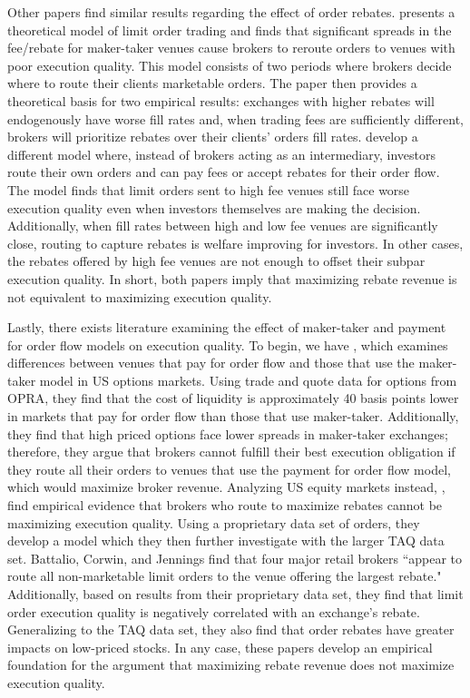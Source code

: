 \documentclass[12pt,a4paper]{extarticle}
\begin{document}
Other papers find similar results regarding the effect of order rebates. \citet{Cimon} presents a theoretical model of limit order trading and finds that significant spreads in the fee/rebate for maker-taker venues cause brokers to reroute orders to venues with poor execution quality. This model consists of two periods where brokers decide where to route their clients marketable orders. The paper then provides a theoretical basis for two empirical results: exchanges with higher rebates will endogenously have worse fill rates and, when trading fees are sufficiently different, brokers will prioritize rebates over their clients' orders fill rates. \citet{Maglaras} develop a different model where, instead of brokers acting as an intermediary, investors route their own orders and can pay fees or accept rebates for their order flow. The model finds that limit orders sent to high fee venues still face worse execution quality even when investors themselves are making the decision. Additionally, when fill rates between high and low fee venues are significantly close, routing to capture rebates is welfare improving for investors. In other cases, the rebates offered by high fee venues are not enough to offset their subpar execution quality. In short, both papers imply that maximizing rebate revenue is not equivalent to maximizing execution quality. 

Lastly, there exists literature examining the effect of maker-taker and payment for order flow models on execution quality. To begin, we have \citet{BSVN}, which examines differences between venues that pay for order flow and those that use the maker-taker model in US options markets. Using trade and quote data for options from OPRA, they find that the cost of liquidity is approximately 40 basis points lower in markets that pay for order flow than those that use maker-taker. Additionally, they find that high priced options face lower spreads in maker-taker exchanges; therefore, they argue that brokers cannot fulfill their best execution obligation if they route all their orders to venues that use the payment for order flow model, which would maximize broker revenue. Analyzing US equity markets instead, \citet{BCJ}, find empirical evidence that brokers who route to maximize rebates cannot be maximizing execution quality. Using a proprietary data set of orders, they develop a model which they then further investigate with the larger TAQ data set. Battalio, Corwin, and Jennings find that four major retail brokers ``appear to route all non-marketable limit orders to the venue offering the largest rebate." Additionally, based on results from their proprietary data set, they find that limit order execution quality is negatively correlated with an exchange's rebate. Generalizing to the TAQ data set, they also find that order rebates have greater impacts on low-priced stocks. In any case, these papers develop an empirical foundation for the argument that maximizing rebate revenue does not maximize execution quality. 
\end{document}
